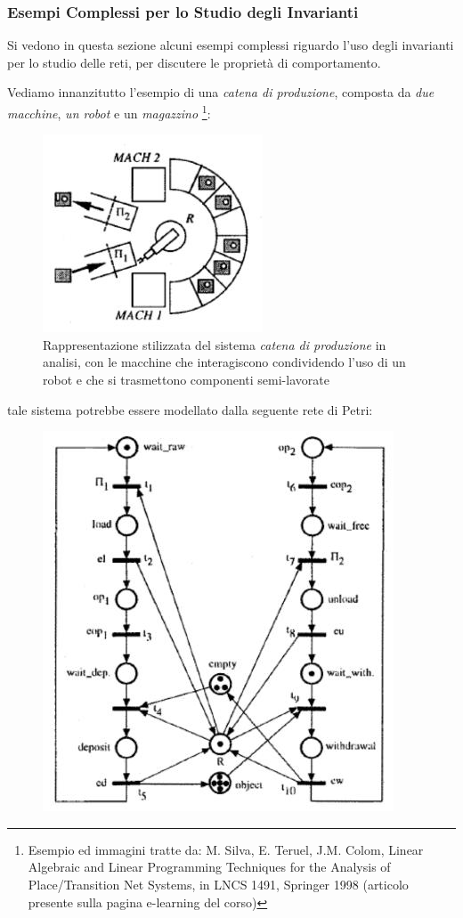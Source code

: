 \documentclass[a4paper,12pt, oneside]{book}
\begin{document}
\subsubsection{Esempi Complessi per lo Studio degli Invarianti}
Si vedono in questa sezione alcuni esempi complessi riguardo l'uso degli
invarianti per lo studio delle reti, per discutere le proprietà di
comportamento.
\begin{esempio}
  Vediamo innanzitutto l'esempio di una \emph{catena di produzione}, composta da
  \emph{due macchine}, \emph{un robot} e un \emph{magazzino}
  \footnote{Esempio ed immagini tratte da: M. Silva, E. Teruel, J.M. Colom,
    Linear Algebraic and Linear Programming Techniques for the Analysis of
    Place/Transition Net Systems, in LNCS 1491, Springer 1998 (articolo presente
    sulla pagina e-learning del corso)}:
  \begin{figure}[H]
    \centering
    \includegraphics[scale = 0.7]{img/ca.jpg}
    \caption{Rappresentazione stilizzata del sistema \emph{catena di produzione}
      in analisi, con le macchine che interagiscono condividendo l'uso di un
      robot e che si trasmettono componenti semi-lavorate} 
  \end{figure}
  \newpage
  tale sistema potrebbe essere modellato dalla seguente rete di Petri:
  \begin{figure}[H]
    \centering
    \includegraphics[scale = 0.7]{img/ca2.jpg}

\end{figure}
\end{esempio}
\end{document}
